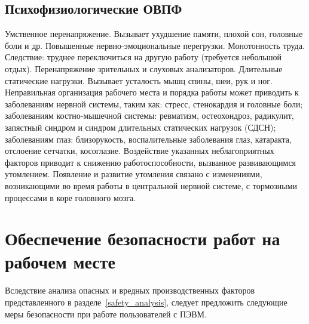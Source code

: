 \documentclass[utf8,usehyperref,12pt]{G7-32}
\begin{document}
\subsection{Психофизиологические ОВПФ}
Умственное перенапряжение. Вызывает ухудшение памяти, плохой сон, головные боли и др.
Повышенные нервно-эмоциональные перегрузки.
Монотонность труда. Следствие: труднее переключиться на другую работу (требуется небольшой отдых).
Перенапряжение зрительных и слуховых анализаторов.
Длительные статические нагрузки. Вызывает усталость мышц спины, шеи, рук и ног.
Неправильная организация рабочего места и порядка работы может приводить к заболеваниям нервной системы, таким как: стресс, стенокардия и головные боли; заболеваниям костно-мышечной системы: ревматизм, остеохондроз, радикулит, запястный синдром и синдром длительных статических нагрузок (СДСН); заболеваниям глаз: близорукость, воспалительные заболевания глаз, катаракта, отслоение сетчатки, косоглазие.
Воздействие указанных неблагоприятных факторов приводит к снижению работоспособности, вызванное развивающимся утомлением. Появление и развитие утомления связано с изменениями, возникающими во время работы в центральной нервной системе, с тормозными процессами в коре головного мозга.

\section{Обеспечение безопасности работ на рабочем месте}
Вследствие анализа опасных и вредных производственных факторов представленного в разделе~\ref{safety_analysis}, следует предложить следующие меры безопасности при работе пользователей с ПЭВМ.
\end{document}
